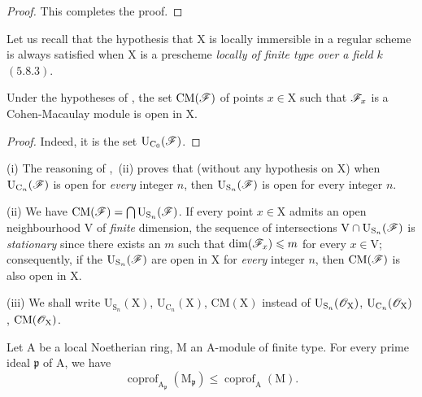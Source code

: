 \begin{proof}
This completes the proof.
\end{proof}

Let us recall that the hypothesis that $\mathrm{X}$ is locally immersible in a regular scheme
is always satisfied when $\mathrm{X}$ is a prescheme \emph{locally of finite type over a field $k$}
$(5.8.3)$.

\begin{corollary}[6.11.3]
\label{IV.6.11.3}
Under the hypotheses of , the set $\mathrm{CM}(\mathscr{F})$ of points
$x\in\mathrm{X}$ such that $\mathscr{F}_x$ is a Cohen-Macaulay module is open in $\mathrm{X}$.
\end{corollary}

\begin{proof}
Indeed, it is the set $\mathrm{U}_{\mathrm{C}_0}(\mathscr{F})$.
\end{proof}

\begin{remarks}[6.11.4]
\label{IV.6.11.4}
(i) The reasoning of ,~(ii) proves that (without any
hypothesis on $\mathrm{X}$) when $\mathrm{U}_{\mathrm{C}_n}(\mathscr{F})$ is open for \emph{every} integer $n$, then $\mathrm{U}_{\mathrm{S}_n}(\mathscr{F})$ is open
for every integer $n$.

(ii) We have $\mathrm{CM}(\mathscr{F})=\bigcap\mathrm{U}_{\mathrm{S}_n}(\mathscr{F})$. If every point $x\in\mathrm{X}$ admits an open neighbourhood $\mathrm{V}$
of \emph{finite} dimension, the sequence of intersections $\mathrm{V}\cap\mathrm{U}_{\mathrm{S}_n}(\mathscr{F})$ is \emph{stationary} since
there exists an $m$ such that $\dim(\mathscr{F}_x)\leqslant m$ for every $x\in\mathrm{V}$; consequently, if the $\mathrm{U}_{\mathrm{S}_n}(\mathscr{F})$ are open
in $\mathrm{X}$ for \emph{every} integer $n$, then $\mathrm{CM}(\mathscr{F})$ is also open in $\mathrm{X}$.

(iii) We shall write $\mathrm{U}_{\mathrm{S}_n}(\mathrm{X})$, $\mathrm{U}_{\mathrm{C}_n}(\mathrm{X})$, $\mathrm{CM}(\mathrm{X})$ instead of $\mathrm{U}_{\mathrm{S}_n}(\mathscr{O}_\mathrm{X})$, $\mathrm{U}_{\mathrm{C}_n}(\mathscr{O}_\mathrm{X})$, $\mathrm{CM}(\mathscr{O}_\mathrm{X})$.
\end{remarks}

\begin{proposition}[6.11.5]
\label{IV.6.11.5}
Let $\mathrm{A}$ be a local Noetherian ring, $\mathrm{M}$ an $\mathrm{A}$-module of finite
type. For every prime ideal $\mathfrak{p}$ of $\mathrm{A}$, we have
\begin{equation}
\tag{6.11.5.1}
\label{IV.6.11.5.1}
  \operatorname{coprof}_{\mathrm{A}_\mathfrak{p}}(\mathrm{M}_\mathfrak{p})\leqslant\operatorname{coprof}_\mathrm{A}(\mathrm{M}).
\end{equation}
\end{proposition}

